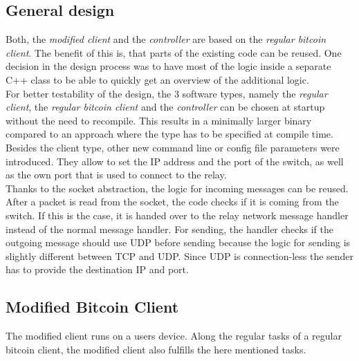 \subsection{General design}
Both, the \textit{modified client} and the \textit{controller} are based on the \textit{regular bitcoin client}. The benefit of this is, that parts of the existing code can be reused. One decision in the design process was to have most of the logic inside a separate C++ class to be able to quickly get an overview of the additional logic.\\
For better testability of the design, the 3 software types, namely the \textit{regular client}, the \textit{regular bitcoin client} and the \textit{controller} can be chosen at startup without the need to recompile. This results in a minimally larger binary compared to an approach where the type has to be specified at compile time. Besides the client type, other new command line or config file parameters were introduced. They allow to set the IP address and the port of the switch, as well as the own port that is used to connect to the relay. \\
Thanks to the socket abstraction, the logic for incoming messages can be reused. After a packet is read from the socket, the code checks if it is coming from the switch. If this is the case, it is handed over to the relay network message handler instead of the normal message handler. For sending, the handler checks if the outgoing message should use UDP before sending because the logic for sending is slightly different between TCP and UDP. Since UDP is connection-less the sender has to provide the destination IP and port.\\

\subsection{Modified Bitcoin Client \label{design:modifiedBitcoinClient}}
The modified client runs on a users device. Along the regular tasks of a regular bitcoin client, the modified client also fulfills the here mentioned tasks.

